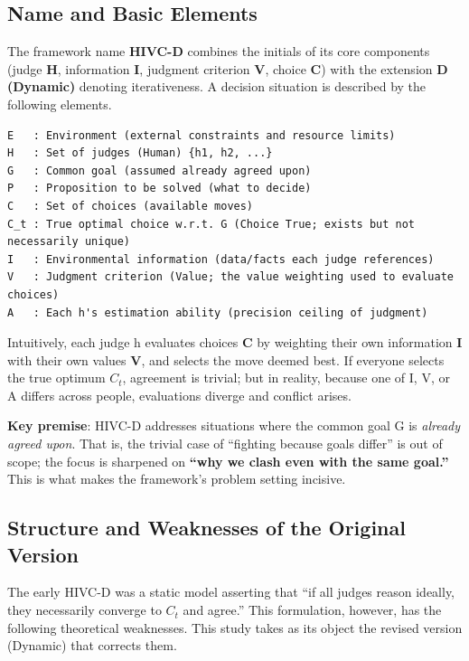 \documentclass[11pt]{article}
\newcommand{\Ct}{\ensuremath{C_t}}
\begin{document}
\subsection{Name and Basic Elements}

The framework name \textbf{HIVC-D} combines the initials of its core components (judge \textbf{H}, information \textbf{I}, judgment criterion \textbf{V}, choice \textbf{C}) with the extension \textbf{D (Dynamic)} denoting iterativeness. A decision situation is described by the following elements.

\begin{Verbatim}[frame=single,fontsize=\small]
E   : Environment (external constraints and resource limits)
H   : Set of judges (Human) {h1, h2, ...}
G   : Common goal (assumed already agreed upon)
P   : Proposition to be solved (what to decide)
C   : Set of choices (available moves)
C_t : True optimal choice w.r.t. G (Choice True; exists but not necessarily unique)
I   : Environmental information (data/facts each judge references)
V   : Judgment criterion (Value; the value weighting used to evaluate choices)
A   : Each h's estimation ability (precision ceiling of judgment)
\end{Verbatim}

Intuitively, each judge h evaluates choices \textbf{C} by weighting their own information \textbf{I} with their own values \textbf{V}, and selects the move deemed best. If everyone selects the true optimum \Ct{}, agreement is trivial; but in reality, because one of I, V, or A differs across people, evaluations diverge and conflict arises.

\textbf{Key premise}: HIVC-D addresses situations where the common goal G is \textit{already agreed upon}. That is, the trivial case of ``fighting because goals differ'' is out of scope; the focus is sharpened on \textbf{``why we clash even with the same goal.''} This is what makes the framework's problem setting incisive.

\subsection{Structure and Weaknesses of the Original Version}

The early HIVC-D was a static model asserting that ``if all judges reason ideally, they necessarily converge to \Ct{} and agree.'' This formulation, however, has the following theoretical weaknesses. This study takes as its object the revised version (Dynamic) that corrects them.
\end{document}
